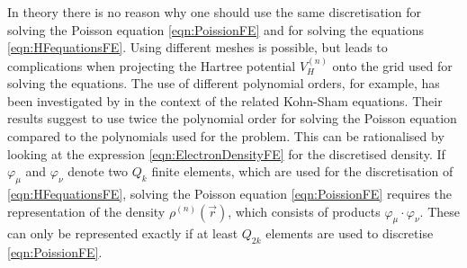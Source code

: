 In theory there is no reason why
one should use the same discretisation
for solving the Poisson equation \eqref{eqn:PoissionFE}
and for solving the \HF equations \eqref{eqn:HFequationsFE}.
Using different meshes is possible,
but leads to complications when projecting the Hartree potential $V_H^{(n)}$
onto the grid used for solving the \HF equations.
The use of different polynomial orders, for example,
has been investigated by \citet{Davydov2015}
in the context of the related Kohn-Sham equations.
Their results suggest to use twice the polynomial order for solving the Poisson equation
compared to the polynomials used for the \HF problem.
This can be rationalised by looking at the expression \eqref{eqn:ElectronDensityFE}
for the discretised density.
If $\varphi_\mu$ and $\varphi_\nu$ denote two $Q_k$ finite elements,
which are used for the discretisation of \eqref{eqn:HFequationsFE},
solving the Poisson equation \eqref{eqn:PoissionFE} requires the representation of
the density $\rho^{(n)}(\vec{r})$,
which consists of products $\varphi_\mu \cdot \varphi_\nu$.
These can only be represented exactly if at least $Q_{2k}$ elements
are used to discretise \eqref{eqn:PoissionFE}.

%
%


